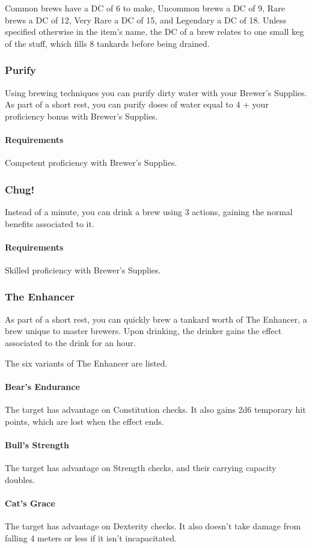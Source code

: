     Common brews have a DC of 6 to make, Uncommon brews a DC of 9, Rare brews a DC of 12, Very Rare a DC of 15, and Legendary a DC of 18.
    Unless specified otherwise in the item's name, the DC of a brew relates to one small keg of the stuff, which fills 8 tankards before being drained.
\subsubsection{Purify} \label{feat::purify}
    Using brewing techniques you can purify dirty water with your Brewer's Supplies.
    As part of a short rest, you can purify doses of water equal to 4 + your proficiency bonus with Brewer's Supplies.
    \paragraph{Requirements} Competent proficiency with Brewer's Supplies.
\subsubsection{Chug!} \label{feat::chug}
    Instead of a minute, you can drink a brew using 3 actions, gaining the normal benefits associated to it.
    \paragraph{Requirements} Skilled proficiency with Brewer's Supplies.
\subsubsection{The Enhancer} \label{feat::theenhancer}
    As part of a short rest, you can quickly brew a tankard worth of The Enhancer, a brew unique to master brewers.
    Upon drinking, the drinker gains the effect associated to the drink for an hour.

    The six variants of The Enhancer are listed.
    \paragraph{Bear's Endurance} The target has advantage on Constitution checks.
    It also gains 2d6 temporary hit points, which are lost when the effect ends.
    \paragraph{Bull's Strength} The target has advantage on Strength checks, and their carrying capacity doubles.
    \paragraph{Cat's Grace} The target has advantage on Dexterity checks.
    It also doesn't take damage from falling 4 meters or less if it isn't incapacitated.
